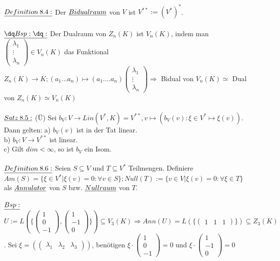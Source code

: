 \documentclass[fleqn, a4paper, 11pt]{article}
\begin{document}
\\
$\uline{Definition\:8.4:}$ Der $\uline{Bidualraum}$ von $V$ ist $V^{\ast\ast}:=(V^{\ast})^{\ast}$.\\
\\
$\uline{\dq Bsp:\dq:}$ Der Dualraum von $Z_n(K)$ ist $V_n(K)$, indem man $\begin{pmatrix}
	\lambda_1\\
	\vdots\\
	\lambda_n
\end{pmatrix}\in V_n(K)$ das Funktional $Z_n(K)\rightarrow K;(a_1...a_n)\mapsto(a_1....a_n)\begin{pmatrix}
	\lambda_1\\
	\vdots\\
	\lambda_n
\end{pmatrix}\Rightarrow$ Bidual von $V_n(K)\simeq$ Dual von $Z_n(K)\simeq V_n(K)$\\
\\
$\uline{Satz\:8.5:}$ (\"U) Sei $b_V:V\rightarrow Lin(V^{\ast},K)=V^{\ast\ast},v\mapsto(b_V(v):\xi\in V^{\ast}\mapsto \xi(v))$. Dann gelten: a) $b_V(v)$ ist in der Tat linear.\\
b) $b_V:V\rightarrow V^{\ast\ast}$ ist linear.\\
c) Gilt $dim < \infty$, so ist $b_V$ ein Isom.\\
\\
$\uline{Definition\:8.6:}$ Seien $S\subseteq V$ und $T \subseteq V^{\ast}$ Teilmengen. Definiere $Am(S)=\{\xi\in V^{\ast}|\xi(v)=0:\forall v\in S\};Null(T):=\{v\in V|\xi(v)=0:\forall\xi\in T\}$ als $\uline{Annulator}$ von $S$ bzw. $\uline{Nullraum}$ von $T$.\\
\\
$\uline{Bsp:}$ $U:=L(\{\begin{pmatrix}
	1\\
	0\\
	-1
\end{pmatrix},\begin{pmatrix}
	1\\
	-1\\
	0
\end{pmatrix}\})\subseteq V_3(K)\Rightarrow Ann(U)=L(\{\begin{pmatrix} 1&1&1\end{pmatrix}\})\subseteq Z_3(K)$. Sei $\xi=(\begin{pmatrix}\lambda_1&\lambda_2&\lambda_3\end{pmatrix})$, ben\"otigen $\xi\cdot\begin{pmatrix}
	1\\
	0\\
	-1
\end{pmatrix}=0$ und $\xi\cdot\begin{pmatrix}
	1\\
	-1\\
	0
\end{pmatrix}=0$\\
\end{document}
